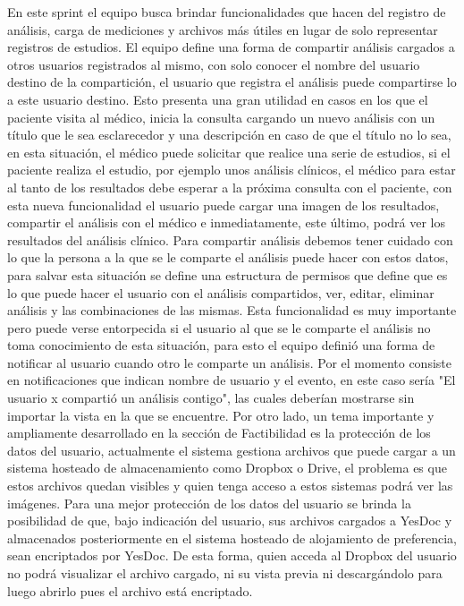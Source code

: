 En este sprint el equipo busca brindar funcionalidades que hacen del registro de análisis, carga de mediciones y archivos más útiles en lugar de solo representar registros de estudios. El equipo define una forma de compartir análisis cargados a otros usuarios registrados al mismo, con solo conocer el nombre del usuario destino de la compartición, el usuario que registra el análisis puede compartirse lo a este usuario destino. Esto presenta una gran utilidad en casos en los que el paciente visita al médico, inicia la consulta cargando un nuevo análisis con un título que le sea esclarecedor y una descripción en caso de que el título no lo sea, en esta situación, el médico puede solicitar que realice una serie de estudios, si el paciente realiza el estudio, por ejemplo unos análisis clínicos, el médico para estar al tanto de los resultados debe esperar a la próxima consulta con el paciente, con esta nueva funcionalidad el usuario puede cargar una imagen de los resultados, compartir el análisis con el médico e inmediatamente, este último, podrá ver los resultados del análisis clínico. Para compartir análisis debemos tener cuidado con lo que la persona a la que se le comparte el análisis puede hacer con estos datos, para salvar esta situación se define una estructura de permisos que define que es lo que puede hacer el usuario con el análisis compartidos, ver, editar, eliminar análisis y las combinaciones de las mismas. Esta funcionalidad es muy importante pero puede verse entorpecida si el usuario al que se le comparte el análisis no toma conocimiento de esta situación, para esto el equipo definió una forma de notificar al usuario cuando otro le comparte un análisis. Por el momento consiste en notificaciones que indican nombre de usuario y el evento, en este caso sería "El usuario x compartió un análisis contigo", las cuales deberían mostrarse sin importar la vista en la que se encuentre. Por otro lado, un tema importante y ampliamente desarrollado en la sección de Factibilidad es la protección de los datos del usuario, actualmente el sistema gestiona archivos que puede cargar a un sistema hosteado de almacenamiento como Dropbox o Drive, el problema es que estos archivos quedan visibles y quien tenga acceso a estos sistemas podrá ver las imágenes. Para una mejor protección de los datos del usuario se brinda la posibilidad de que, bajo indicación del usuario, sus archivos cargados a YesDoc y almacenados posteriormente en el sistema hosteado de alojamiento de preferencia, sean encriptados por YesDoc. De esta forma, quien acceda al Dropbox del usuario no podrá visualizar el archivo cargado, ni su vista previa ni descargándolo para luego abrirlo pues el archivo está encriptado. 

